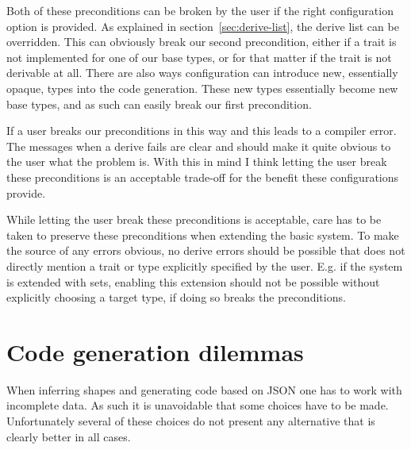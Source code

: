 

Both of these preconditions can be broken by the user if the right configuration option is provided. As explained in section~\ref{sec:derive-list}, the derive list can be overridden. This can obviously break our second precondition, either if a trait is not implemented for one of our base types, or for that matter if the trait is not derivable at all. There are also ways configuration can introduce new, essentially opaque, types into the code generation. These new types essentially become new base types, and as such can easily break our first precondition.

If a user breaks our preconditions in this way and this leads to a compiler error. The messages when a derive fails are clear and should make it quite obvious to the user what the problem is. With this in mind I think letting the user break these preconditions is an acceptable trade-off for the benefit these configurations provide.

While letting the user break these preconditions is acceptable, care has to be taken to preserve these preconditions when extending the basic system. To make the source of any errors obvious, no derive errors should be possible that does not directly mention a trait or type explicitly specified by the user. E.g. if the system is extended with sets, enabling this extension should not be possible without explicitly choosing a target type, if doing so breaks the preconditions.

\section{Code generation dilemmas}
\label{sec:design-considerations}

When inferring shapes and generating code based on JSON one has to work with incomplete data. As such it is unavoidable that some choices have to be made. Unfortunately several of these choices do not present any alternative that is clearly better in all cases.




